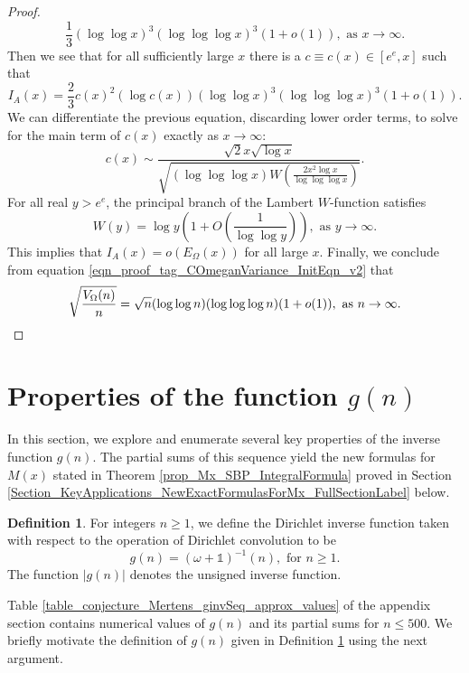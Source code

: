 \documentclass[11pt,reqno,a4letter]{article}
\newcommand{\hlocalref}[1]{\hyperref[#1]{\ref{#1}}}
\numberwithin{equation}{section}
\numberwithin{figure}{section}
\numberwithin{table}{section}
\theoremstyle{plain}
\numberwithin{theorem}{section}
\theoremstyle{definition}
\newtheorem{definition}[theorem]{Definition}
\begin{document}
\begin{proof}
\[	\frac{1}{3} (\log\log x)^3 (\log\log\log x)^3 (1+o(1)), 
	\text{ as } x \rightarrow \infty. 
\]
Then we see that for all sufficiently large $x$ there is a $c \equiv c(x) \in [e^e, x]$ 
such that 
\[
I_A(x) = \frac{2}{3} c(x)^2 (\log c(x)) (\log\log x)^3 (\log\log\log x)^3 (1+o(1)). 
\]
We can differentiate the previous equation, discarding lower order terms, to solve 
for the main term of $c(x)$ exactly as $x \rightarrow \infty$: 
\[
c(x) \sim \frac{\sqrt{2} x \sqrt{\log x}}{\sqrt{(\log\log\log x) W\left( 
	\frac{2x^2 \log x}{\log\log\log x}\right)}}. 
\]
For all real $y > e^e$, the principal branch of the Lambert $W$-function satisfies
\[
W(y) = \log y \left(1 + O\left(\frac{1}{\log\log y}\right)\right), 
     \text{ as } y \rightarrow \infty. 
\]
This implies that $I_A(x) = o\left(E_{\Omega}(x)\right)$ for all large $x$. 
Finally, we conclude from equation \eqref{eqn_proof_tag_COmeganVariance_InitEqn_v2} that 
\[
\sqrt{\frac{V_{\Omega}(n)}{n}} = \sqrt{n} (\log\log n) (\log\log\log n) (1 + o(1)), 
     \text{ as } n \rightarrow \infty. 
     \qedhere
\]
\end{proof}

\section{Properties of the function $g(n)$} 
\label{Section_NewFormulasForgInvn_v2} 

In this section, we explore and enumerate several key properties of the inverse function 
$g(n)$. The partial sums of this sequence yield the new formulas for $M(x)$ stated in 
Theorem \hlocalref{prop_Mx_SBP_IntegralFormula} proved in 
Section \hlocalref{Section_KeyApplications_NewExactFormulasForMx_FullSectionLabel} below. 

\begin{definition}
\label{def_gn_and_Absgn_v2} 
For integers $n \geq 1$, we define the Dirichlet inverse function 
taken with respect to the operation of Dirichlet convolution to be 
\[
g(n) = (\omega + \mathds{1})^{-1}(n), \text{ for } n \geq 1. 
\]
The function $|g(n)|$ denotes the unsigned inverse function. 
\end{definition}

Table \hlocalref{table_conjecture_Mertens_ginvSeq_approx_values} 
of the appendix section contains numerical values of $g(n)$ and its 
partial sums for $n \leq 500$. 
We briefly motivate the definition of $g(n)$ given in 
Definition \hlocalref{def_gn_and_Absgn_v2} using the next argument.
\end{document}
